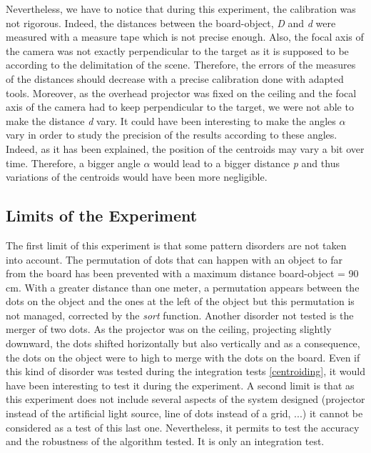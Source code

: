 Nevertheless, we have to notice that during this experiment, the calibration was not rigorous. Indeed, the distances between the board-object, \emph{D} and \emph{d} were measured with a measure tape which is not precise enough. Also, the focal axis of the camera was not exactly perpendicular to the target as it is supposed to be according to the delimitation of the scene. Therefore, the errors of the measures of the distances should decrease with a precise calibration done with adapted tools. Moreover, as the overhead projector was fixed on the ceiling and the focal axis of the camera had to keep perpendicular to the target, we were not able to make the distance \emph{d} vary. It could have been interesting to make the angles $\alpha$ vary in order to study the precision of the results according to these angles. Indeed, as it has been explained, the position of the centroids may vary a bit over time. Therefore, a bigger angle $\alpha$ would lead to a bigger distance \emph{p} and thus variations of the centroids would have been more negligible.





\subsection{Limits of the Experiment}
The first limit of this experiment is that some pattern disorders are not taken into account. The permutation of dots that can happen with an object to far from the board has been prevented with a maximum distance board-object = 90 cm. With a greater distance than one meter, a permutation appears between the dots on the object and the ones at the left of the object but this permutation is not managed, corrected by the \emph{sort} function. Another disorder not tested is the merger of two dots. As the projector was on the ceiling, projecting slightly downward, the dots shifted horizontally but also vertically and as a consequence, the dots on the object were to high to merge with the dots on the board. Even if this kind of disorder was tested during the integration tests \ref{centroiding}, it would have been interesting to test it during the experiment.
A second limit is that as this experiment does not include several aspects of the system designed (projector instead of the artificial light source, line of dots instead of a grid, ...) it cannot be considered as a test of this last one. Nevertheless, it permits to test the accuracy and the robustness of the algorithm tested. It is only an integration test.





